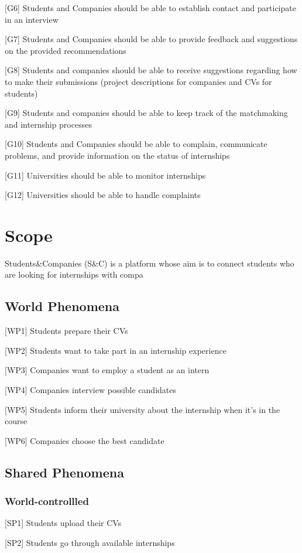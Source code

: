 [G6] Students and Companies should be able to establish contact and participate in an interview

[G7] Students and Companies should be able to provide feedback and suggestions on the provided recommendations

[G8] Students and companies should be able to receive suggestions regarding how to make their submissions (project descriptions for companies and CVs for students)

[G9] Students and companies should be able to keep track of the matchmaking and internship processes

[G10] Students and Companies should be able to complain, communicate problems, and provide information on the status of internships

[G11] Universities should be able to monitor internships

[G12] Universities should be able to handle complaints


\section{Scope}
Students\&Companies (S\&C) is a platform whose aim is to connect students who are looking for internships with compa 

\subsection{World Phenomena}
[WP1] Students prepare their CVs

[WP2] Students want to take part in an internship experience 

[WP3] Companies want to employ a student as an intern 

[WP4] Companies interview possible candidates 

[WP5] Students inform their university about the internship when it's in the course

[WP6] Companies choose the best candidate

\subsection{Shared Phenomena}

\subsubsection{World-controllled}
[SP1] Students upload their CVs

[SP2] Students go through available internships

